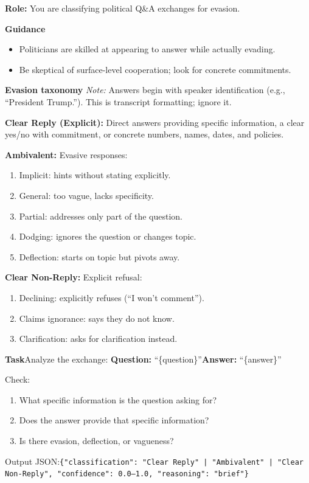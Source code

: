 \documentclass[11pt]{article}
\begin{document}
\begin{promptbox}
\textbf{Role:} You are classifying political Q\&A exchanges for evasion.\smallskip

\textbf{Guidance}
\begin{itemize}[leftmargin=1.5em,topsep=1pt,itemsep=0pt]
\item Politicians are skilled at appearing to answer while actually evading.
\item Be skeptical of surface-level cooperation; look for concrete commitments.
\end{itemize}\smallskip

\textbf{Evasion taxonomy}\quad
\textit{Note:} Answers begin with speaker identification (e.g., ``President Trump.''). This is transcript formatting; ignore it.\smallskip

\textbf{Clear Reply (Explicit):} Direct answers providing specific information, a clear yes/no with commitment, or concrete numbers, names, dates, and policies.\smallskip

\textbf{Ambivalent:} Evasive responses:
\begin{enumerate}[leftmargin=1.7em,topsep=1pt,itemsep=0pt]
\item Implicit: hints without stating explicitly.
\item General: too vague, lacks specificity.
\item Partial: addresses only part of the question.
\item Dodging: ignores the question or changes topic.
\item Deflection: starts on topic but pivots away.
\end{enumerate}\smallskip

\textbf{Clear Non-Reply:} Explicit refusal:
\begin{enumerate}[leftmargin=1.7em,topsep=1pt,itemsep=0pt]
\item Declining: explicitly refuses (``I won't comment'').
\item Claims ignorance: says they do not know.
\item Clarification: asks for clarification instead.
\end{enumerate}\smallskip

\textbf{Task}\quad Analyze the exchange:\quad
\textbf{Question:} ``\{question\}''\quad \textbf{Answer:} ``\{answer\}''\smallskip

Check:
\begin{enumerate}[leftmargin=1.7em,topsep=1pt,itemsep=0pt]
\item What specific information is the question asking for?
\item Does the answer provide that specific information?
\item Is there evasion, deflection, or vagueness?
\end{enumerate}\smallskip

Output JSON:\quad \texttt{\{"classification": "Clear Reply" | "Ambivalent" | "Clear Non-Reply", "confidence": 0.0--1.0, "reasoning": "brief"\}}
\end{promptbox}
\end{document}
